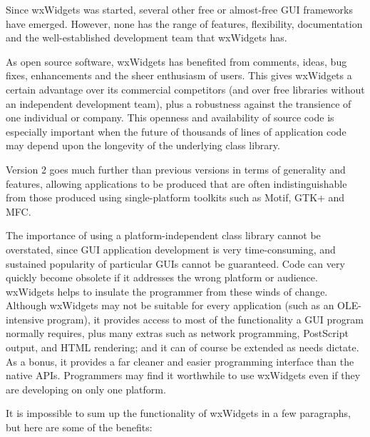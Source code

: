 Since wxWidgets was started, several other free or almost-free
GUI frameworks have emerged. However, none has the range of
features, flexibility, documentation and the well-established
development team that wxWidgets has.

As open source software, wxWidgets has benefited from comments,
ideas, bug fixes, enhancements and the sheer enthusiasm of
users. This gives wxWidgets a certain advantage over its
commercial competitors (and over free libraries without an
independent development team), plus a robustness against the
transience of one individual or company. This openness and
availability of source code is especially important when the
future of thousands of lines of application code may depend upon
the longevity of the underlying class library.

Version 2 goes much further than previous versions in terms of
generality and features, allowing applications to be produced
that are often indistinguishable from those produced using
single-platform toolkits such as Motif, GTK+ and MFC.

The importance of using a platform-independent class library
cannot be overstated, since GUI application development is very
time-consuming, and sustained popularity of particular GUIs
cannot be guaranteed. Code can very quickly become obsolete if
it addresses the wrong platform or audience.  wxWidgets helps to
insulate the programmer from these winds of change. Although
wxWidgets may not be suitable for every application (such as an
OLE-intensive program), it provides access to most of the
functionality a GUI program normally requires, plus many extras
such as network programming, PostScript output, and HTML
rendering; and it can of course be extended as needs dictate.
As a bonus, it provides a far cleaner and easier programming
interface than the native APIs. Programmers may find it
worthwhile to use wxWidgets even if they are developing on only
one platform.

It is impossible to sum up the functionality of wxWidgets in a few paragraphs, but
here are some of the benefits:

